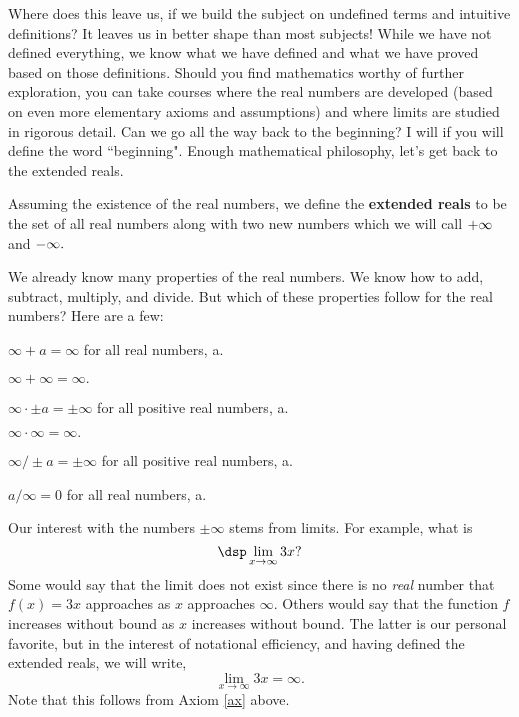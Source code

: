 Where does this leave us, if we build the subject on undefined terms and intuitive definitions?    It leaves us in better shape than most subjects!  While we have not defined everything, we know what we have defined and what we have proved based on those definitions.  Should you find mathematics worthy of further exploration, you can take courses where the real numbers are developed (based on even more elementary axioms and assumptions) and where limits are studied in rigorous detail. Can we go all the way back to the beginning? I will if you will define the word ``beginning".  Enough mathematical philosophy, let's get back to the extended reals.

\begin{dfn}
Assuming the existence of the real numbers, we define the {\bf extended reals} to be the set of all real numbers along with two new numbers which we will call ${\bf +\infty}$ and ${\bf -\infty}.$
\end{dfn}

We already know many properties of the real numbers.  We know how to add, subtract, multiply, and divide.  But which of these properties follow for the real numbers?  Here are a few:

\begin{axm}
$\infty + a = \infty$ for all real numbers, a.
\end{axm}

\begin{axm}
$\infty + \infty = \infty.$
\end{axm}

\begin{axm}
\label{ax}
$\infty \cdot \pm a = \pm \infty$ for all positive real numbers,
a.
\end{axm}

\begin{axm}
$\infty \cdot  \infty = \infty.$
\end{axm}

\begin{axm}
$\infty / \pm a = \pm \infty$ for all positive real numbers, a.
\end{axm}

\begin{axm}
$a / \infty  = 0$ for all real numbers, a.
\end{axm}

Our interest with the numbers $\pm \infty$ stems from limits.  For example, what is $$\dsp \lim_{x \rightarrow \infty} 3x?$$   Some would say that the limit does not exist since there is no {\it real} number that $f(x) = 3x$ approaches as $x$ approaches $\infty.$  Others would say that the function $f$ increases without bound as $x$ increases without bound.  The latter is our personal favorite, but in the interest of notational efficiency, and having defined the extended reals, we will write, $$\lim_{x \rightarrow \infty} 3x = \infty.$$  Note that this follows from Axiom \ref{ax} above.

